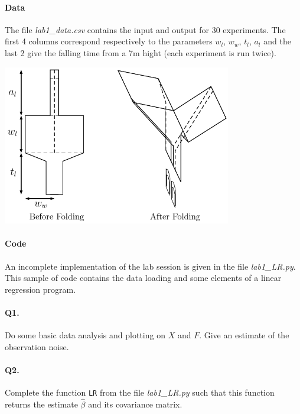\documentclass[12pt]{scrartcl}
\begin{document}
\paragraph{Data} The file \emph{lab1\_data.csv} contains the input and output for 30 experiments. The first 4 columns correspond respectively to the parameters $w_l$, $w_w$, $t_l$, $a_l$ and the last 2 give the falling time from a 7m hight (each experiment is run twice).
\begin{center}
	\includegraphics[width=10cm]{figures/helico.pdf}
\end{center}

\paragraph{Code} An incomplete implementation of the lab session is given in the file \emph{lab1\_LR.py}. This sample of code contains the data loading and some elements of a linear regression program.

\paragraph{Q1.} Do some basic data analysis and plotting on $X$ and $F$. Give an estimate of the observation noise.

\paragraph{Q2.} Complete the function \texttt{LR} from the file \emph{lab1\_LR.py} such that this function returns the estimate $\hat{\beta}$ and its covariance matrix.
\end{document}
